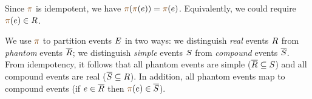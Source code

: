 Since $\fmrg{}$ is idempotent, we have $\fmrg{\fmrg{\aEv}} = \fmrg{\aEv}$.
Equivalently, we could require $\fmrg{\aEv}\in\reEvs$.

We use $\fmrg{}$ to partition events $E$ in two ways: we distinguish
\emph{real} events $R$ from \emph{phantom} events $\overline{R}$; we
distinguish \emph{simple} events $S$ from \emph{compound} events
$\overline{S}$.   From idempotency, it follows that all phantom events are simple
($\overline{R}\subseteq S$) and all compound events are real
($\overline{S}\subseteq R$).  In addition, all phantom events map to compound
events (if $e\in\overline{R}$ then $\fmrg{\aEv}\in\dmEvs$).


